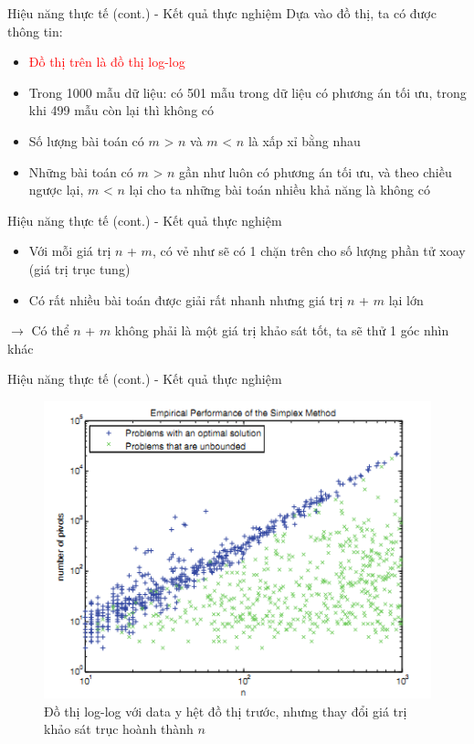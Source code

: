 \documentclass[10pt]{beamer}
\begin{document}
\begin{frame}[fragile]{Hiệu năng thực tế (cont.) - Kết quả thực nghiệm}
Dựa vào đồ thị, ta có được thông tin:
\begin{itemize}
\item \textcolor{red}{Đồ thị trên là đồ thị log-log}
\item Trong 1000 mẫu dữ liệu: có 501 mẫu trong dữ liệu có phương án tối ưu, trong khi 499 mẫu còn lại thì không có
\item Số lượng bài toán có $m$ > $n$ và $m$ < $n$ là xấp xỉ bằng nhau
\item Những bài toán có $m$ > $n$ gần như luôn có phương án tối ưu, và theo chiều ngược lại, $m$ < $n$ lại cho ta những bài toán nhiều khả năng là không có
\end{itemize}
\end{frame}

\begin{frame}[fragile]{Hiệu năng thực tế (cont.) - Kết quả thực nghiệm}
\begin{itemize}
\item Với mỗi giá trị $n$ + $m$, có vẻ như sẽ có 1 chặn trên cho số lượng phần tử xoay (giá trị trục tung)
\item Có rất nhiều bài toán được giải rất nhanh nhưng giá trị $n$ + $m$ lại lớn
\end{itemize}
$\rightarrow$ Có thể $n$ + $m$ không phải là một giá trị khảo sát tốt, ta sẽ thử 1 góc nhìn khác
\end{frame}

\begin{frame}[fragile]{Hiệu năng thực tế (cont.) - Kết quả thực nghiệm}
\begin{figure}
\includegraphics[scale=.5]{img/plot_2.png}
\caption{Đồ thị log-log với data y hệt đồ thị trước, nhưng thay đổi giá trị khảo sát trục hoành thành $n$}
\end{figure}
\end{frame}
\end{document}

